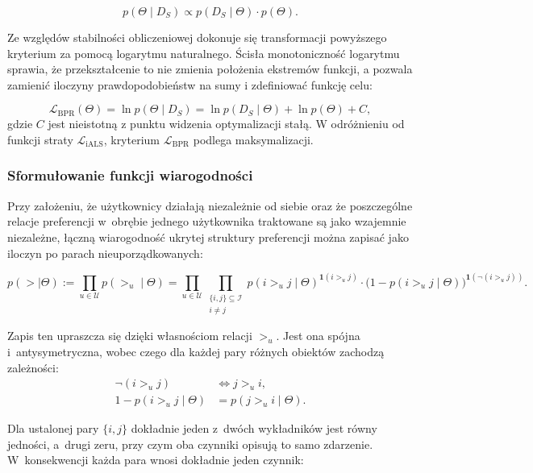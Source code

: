 \begin{equation}
    p(\Theta \mid D_S) \propto p(D_S \mid \Theta) \cdot p(\Theta).
\end{equation}

Ze względów stabilności obliczeniowej dokonuje się transformacji powyższego kryterium za pomocą logarytmu naturalnego. Ścisła monotoniczność logarytmu sprawia, że przekształcenie to nie zmienia położenia ekstremów funkcji, a pozwala zamienić iloczyny prawdopodobieństw na sumy i zdefiniować funkcję celu:

\begin{equation}
    \mathcal{L}_{\text{BPR}}(\Theta) = \ln p(\Theta \mid D_S) = \ln p(D_S \mid \Theta) + \ln p(\Theta) + C,
\end{equation}
gdzie $C$ jest nieistotną z punktu widzenia optymalizacji stałą. W odróżnieniu od funkcji straty $\mathcal{L}_{\text{iALS}}$, kryterium $\mathcal{L}_{\text{BPR}}$ podlega maksymalizacji.

\subsubsection{Sformułowanie funkcji wiarogodności}

Przy założeniu, że użytkownicy działają niezależnie od siebie oraz że poszczególne relacje preferencji w~obrębie jednego użytkownika traktowane są jako wzajemnie niezależne, łączną wiarogodność ukrytej struktury preferencji można zapisać jako iloczyn po parach nieuporządkowanych:

\begin{equation}
p(> \mid \Theta)
:= \prod_{u \in \mathcal{U}} p(>_u \mid \Theta)
= \prod_{u \in \mathcal{U}} \prod_{\substack{\{i,j\} \subseteq \mathcal{I} \\ i \neq j}}
p(i >_u j \mid \Theta)^{\mathbf{1}(i >_u j)}
\cdot
\bigl(1 - p(i >_u j \mid \Theta)\bigr)^{\mathbf{1}(\neg(i >_u j))}.
\end{equation}

Zapis ten upraszcza się dzięki własnościom relacji $>_u$. Jest ona spójna i~antysymetryczna, wobec czego dla każdej pary różnych obiektów zachodzą zależności:
\begin{align}
    \neg(i >_u j) &\iff j >_u i, \\
    1 - p(i >_u j \mid \Theta) &= p(j >_u i \mid \Theta).
\end{align}

Dla ustalonej pary $\{i,j\}$ dokładnie jeden z~dwóch wykładników jest równy jedności, a~drugi zeru, przy czym oba czynniki opisują to samo zdarzenie. W~konsekwencji każda para wnosi dokładnie jeden czynnik:

